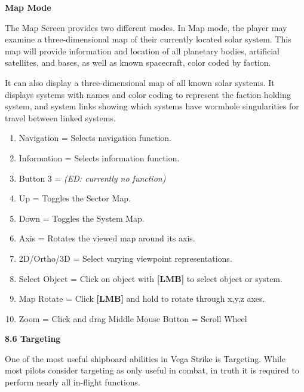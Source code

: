 \documentclass{article}
\begin{document}
\textbf{Map Mode }

The Map Screen provides two different modes. In Map mode, the player may examine a three-dimensional map of their currently located solar system. This map will provide information and location of all planetary bodies, artificial satellites, and bases, as well as known spacecraft, color coded by faction. 

It can also display a three-dimensional map of all known solar systems. It displays systems with names and color coding to represent the faction holding system, and system links showing which systems have wormhole singularities for travel between linked systems. 



\begin{enumerate}
\item  Navigation = Selects navigation function. 

\item  Information = Selects information function. 

\item  Button 3 = \textit{(ED: currently no function) }

\item \textit{ }Up = Toggles the Sector Map. 

\item  Down = Toggles the System Map. 

\item  Axis = Rotates the viewed map around its axis. 

\item  2D/Ortho/3D = Select varying viewpoint representations\textit{. }

\item \textit{ }Select Object = Click on object with \textbf{[LMB]} to select object or system. 

\item  Map Rotate = Click \textbf{[LMB]} and hold to rotate through x,y,z axes. 

\item  Zoom = Click and drag Middle Mouse Button = Scroll Wheel 
\end{enumerate}



\textbf{}

\textbf{}

\textbf{8.6 Targeting }

One of the most useful shipboard abilities in Vega Strike is Targeting. While most pilots consider targeting as only useful in combat, in truth it is required to perform nearly all in-flight functions. 
\end{document}
